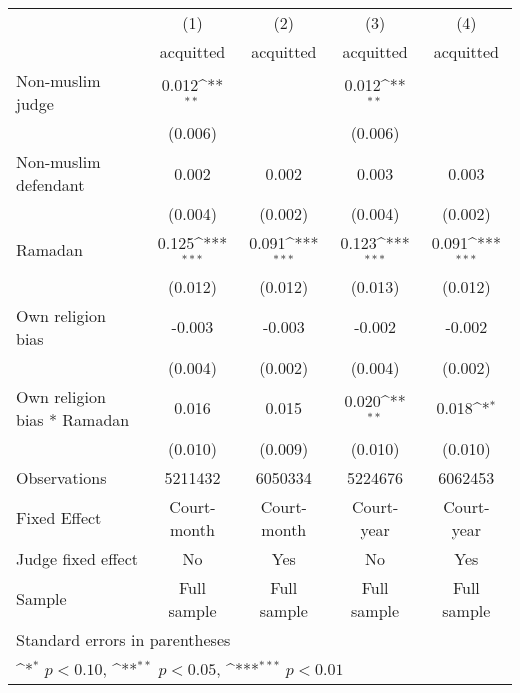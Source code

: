 {
\def\sym#1{\ifmmode^{#1}\else\(^{#1}\)\fi}
\begin{tabular}{l*{4}{c}}
\hline\hline
                    &\multicolumn{1}{c}{(1)}&\multicolumn{1}{c}{(2)}&\multicolumn{1}{c}{(3)}&\multicolumn{1}{c}{(4)}\\
                    &\multicolumn{1}{c}{acquitted}&\multicolumn{1}{c}{acquitted}&\multicolumn{1}{c}{acquitted}&\multicolumn{1}{c}{acquitted}\\
\hline
Non-muslim judge    &       0.012\sym{**} &                     &       0.012\sym{**} &                     \\
                    &     (0.006)         &                     &     (0.006)         &                     \\
[1em]
Non-muslim defendant&       0.002         &       0.002         &       0.003         &       0.003         \\
                    &     (0.004)         &     (0.002)         &     (0.004)         &     (0.002)         \\
[1em]
Ramadan             &       0.125\sym{***}&       0.091\sym{***}&       0.123\sym{***}&       0.091\sym{***}\\
                    &     (0.012)         &     (0.012)         &     (0.013)         &     (0.012)         \\
[1em]
Own religion bias   &      -0.003         &      -0.003         &      -0.002         &      -0.002         \\
                    &     (0.004)         &     (0.002)         &     (0.004)         &     (0.002)         \\
[1em]
Own religion bias * Ramadan&       0.016         &       0.015         &       0.020\sym{**} &       0.018\sym{*}  \\
                    &     (0.010)         &     (0.009)         &     (0.010)         &     (0.010)         \\
\hline
Observations        &     5211432         &     6050334         &     5224676         &     6062453         \\
Fixed Effect        & Court-month         & Court-month         &  Court-year         &  Court-year         \\
Judge fixed effect  &          No         &         Yes         &          No         &         Yes         \\
Sample              & Full sample         & Full sample         & Full sample         & Full sample         \\
\hline\hline
\multicolumn{5}{l}{\footnotesize Standard errors in parentheses}\\
\multicolumn{5}{l}{\footnotesize \sym{*} \(p<0.10\), \sym{**} \(p<0.05\), \sym{***} \(p<0.01\)}\\
\end{tabular}
}
